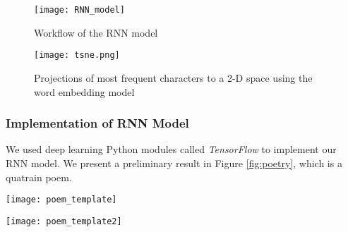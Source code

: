 \begin{figure}[htbp]
	\centering
	\texttt{[image: RNN\_model]}
	\caption{Workflow of the RNN model}
	\label{fig:rnn_workflow}
\end{figure}

\begin{figure}[htbp]
	\centering
	\texttt{[image: tsne.png]}
	\caption{Projections of most frequent characters to a 2-D space using the word embedding model}
	\label{fig:VSM}
\end{figure}



\subsubsection{Implementation of RNN Model} 
%
We used deep learning Python modules called \emph{TensorFlow} \cite{tensorflow} to implement our RNN model. 
%
We present a preliminary result in Figure \ref{fig:poetry}, which is a quatrain poem.
\begin{figure*}[htbp]
	\centering
	\texttt{[image: poem\_template]}
	\caption{A Song Ci generated using LSTM}
	\label{fig:poetry}
\end{figure*}

\begin{figure*}[htbp]
	\centering
	\texttt{[image: poem\_template2]}
	\caption{A Song Ci generated using Genetic Algorithm }
	\label{fig:poetry}
\end{figure*}
